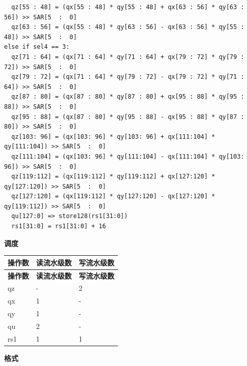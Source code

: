 \begin{lstlisting}
  qz[55 : 48] = (qx[55 : 48] * qy[55 : 48] + qx[63 : 56] * qy[63 : 56]) >> SAR[5  :  0]
  qz[63 : 56] = (qx[55 : 48] * qy[63 : 56] - qx[63 : 56] * qy[55 : 48]) >> SAR[5  :  0]
else if sel4 == 3:
  qz[71 : 64] = (qx[71 : 64] * qy[71 : 64] + qx[79 : 72] * qy[79 : 72]) >> SAR[5  :  0]
  qz[79 : 72] = (qx[71 : 64] * qy[79 : 72] - qx[79 : 72] * qy[71 : 64]) >> SAR[5  :  0]
  qz[87 : 80] = (qx[87 : 80] * qy[87 : 80] + qx[95 : 88] * qy[95 : 88]) >> SAR[5  :  0]
  qz[95 : 88] = (qx[87 : 80] * qy[95 : 88] - qx[95 : 88] * qy[87 : 80]) >> SAR[5  :  0]
  qz[103: 96] = (qx[103: 96] * qy[103: 96] + qx[111:104] * qy[111:104]) >> SAR[5  :  0]
  qz[111:104] = (qx[103: 96] * qy[111:104] - qx[111:104] * qy[103: 96]) >> SAR[5  :  0]
  qz[119:112] = (qx[119:112] * qy[119:112] + qx[127:120] * qy[127:120]) >> SAR[5  :  0]
  qz[127:120] = (qx[119:112] * qy[127:120] - qx[127:120] * qy[119:112]) >> SAR[5  :  0]
  qu[127:0] => store128(rs1[31:0])
  rs1[31:0] = rs1[31:0] + 16
\end{lstlisting}


\textbf{调度}\\
\begin{longtable}[c]{|l|l|l|}
    \hline
    \rowcolor{lightgray}
    \textbf{操作数} & \textbf{读流水级数} & \textbf{写流水级数} \\\hline
    \endfirsthead
    \hline
    \rowcolor{lightgray}
     \textbf{操作数} & \textbf{读流水级数} & \textbf{写流水级数} \\\hline
    \endhead
    \hline
    \endfoot


    qz & - & 2 \\\hline
     qx & 1 & - \\\hline
     qy & 1 & - \\\hline
     qu & 2 & - \\\hline
     rs1 & 1 & 1

\end{longtable}

\textbf{格式}\\

